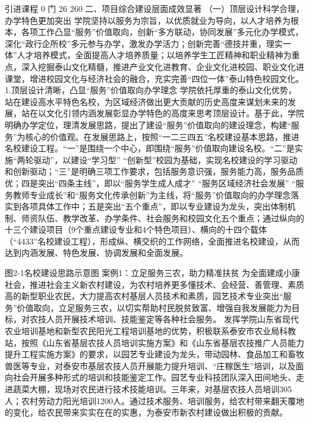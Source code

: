 引进课程
0
门
26
260%
二、项目综合建设层面成效显著
（一）顶层设计科学合理，办学特色更加突出
学院坚持以服务为宗旨，以优质就业为导向，以人才培养为根本，各项工作凸显“服务”价值取向，创新“多方联动，协同发展”多元化办学模式，深化“政行企所校”多元参与办学，激发办学活力；创新完善“德技并重，理实一体”人才培养模式，全面提高人才培养质量；以培养学生工匠精神和职业精神为重点，深入挖掘泰山文化精髓，推进产业文化进教育、企业文化进校园、职业文化进课堂，增进校园文化与经济社会的融合，充实完善“四位一体”泰山特色校园文化。
1.顶层设计清晰，凸显“服务”价值取向办学理念
学院依托厚重的泰山文化优势，站在建设高水平特色名校，为区域经济做出更大贡献的历史高度来谋划未来的发展，站在以文化引领内涵发展彰显办学特色的高度来思考顶层设计。基于此，学院明确办学定位，理清发展思路，提出了建设“服务”价值取向的建设理念，构建“服务”为核心的价值观。在发展思路上，按照“一二三四五”名校建设基本思路，推进名校建设工程。“一”是围绕一个中心，即围绕“服务”价值取向建设名校。“二”是实施“两轮驱动”，以建设“学习型” “创新型”校园为基础，实现名校建设的学习驱动和创新驱动；“三”是明确三项工作要求，包括服务意识强，服务能力高，服务品质优；四是突出“四条主线”，即以“服务学生成人成才” “服务区域经济社会发展” “服务教师专业成长”和“服务文化传承创新”为主线，将“服务”价值取向的办学理念落实到各项具体工作中；五是突出“五个重点”，即以专业建设为龙头，突出体制机制、师资队伍、教学改革、办学条件、社会服务和校园文化五个重点；通过纵向的十三个建设项目（9个重点建设专业和4个特色项目）、横向的十四个载体（“4433”名校建设工程），形成纵、横交织的工作网络，全面推进名校建设，从而达到内涵发展、特色发展、协调发展和全面发展。











图2-1名校建设思路示意图
案例1：立足服务三农，助力精准扶贫
为全面建成小康社会，推进社会主义新农村建设，为农村培养更多懂技术、会经营、善管理、素质高的新型职业农民，大力提高农村基层人员技术和素质，园艺技术专业突出“服务”价值取向，立足服务三农，以切实帮助村民脱贫致富、增强自我发展能力为目标，对农技人员开展技术培训、技能鉴定等各种社会服务。
发挥学院山东省现代农业培训基地和新型农民阳光工程培训基地的优势，积极联系泰安市农业局科教站，按照《山东省基层农技人员培训实施方案》和《山东省基层农技推广人员能力提升工程实施方案》的要求，以园艺专业建设为龙头，带动园林、食品加工和畜牧兽医等专业，对泰安市基层农技人员开展能力提升培训、“庄稼医生”培训，以及面向社会开展多种形式的培训和技能鉴定工作。园艺专业科技团队深入田间地头、走进蔬菜大棚，现场对农民进行技术技能培训。三年来，对基层农技人员培训305人；农村劳动力阳光培训1200人。通过技术服务、培训服务，给农村带来翻天覆地的变化，给农民带来实实在在的实惠，为泰安市新农村建设做出积极的贡献。

